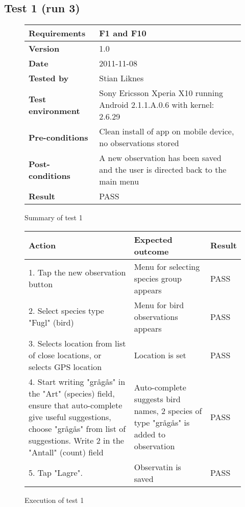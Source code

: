 \newpage
\subsection{Test 1 (run 3)}

	\begin{figure}[htb]
		\centering
		\begin{tabular}{|p{3.5cm}|p{7.0cm}|} \hline
			\textbf{Requirements} & F1 and F10 \\ \hline
			\textbf{Version} & 1.0 \\ \hline
			\textbf{Date} & 2011-11-08 \\ \hline
			\textbf{Tested by} & Stian Liknes \\ \hline
			\textbf{Test environment} & Sony Ericsson Xperia X10 running Android 2.1.1.A.0.6 with kernel: 2.6.29 \\ \hline
			\textbf{Pre-conditions} & Clean install of app on mobile device, no observations stored \\ \hline
			\textbf{Post-conditions} & A new observation has been saved and the user is directed back to the main menu \\ \hline
			\textbf{Result} & PASS \\ \hline
		\end{tabular}
		\caption{Summary of test 1}
	\end{figure}

	\begin{figure}[htb]
		\centering
		\begin{tabular}{|p{5.0cm}|p{5.0cm}|p{1cm}|}
			\hline \textbf{Action} & \textbf{Expected outcome} & \textbf{Result} \\ \hline
			1. Tap the new observation button & Menu for selecting species group appears & PASS \\ \hline
			2. Select species type "Fugl" (bird) & Menu for bird observations appears & PASS \\ \hline
			3. Selects location from list of close locations, or selects GPS location & Location is set & PASS \\ \hline
			4. Start writing "grågås" in the "Art" (species) field, ensure that
			auto-complete give useful suggestions, choose "grågås" from list of
			suggestions. Write 2 in the "Antall" (count) field & Auto-complete
			suggests bird names, 2 species of type "grågås" is added to observation
			& PASS \\ \hline 
			5. Tap "Lagre". & Observatin is saved & PASS \\ \hline
		\end{tabular}
		\caption{Execution of test 1}
	\end{figure}

